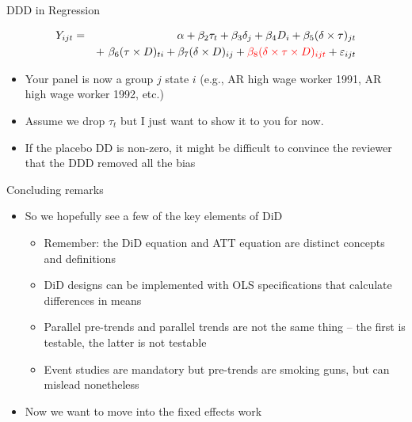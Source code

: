 \documentclass{beamer}
\begin{document}
\begin{frame}{DDD in Regression}
	
	\begin{eqnarray*}
	Y_{ijt} &=&\alpha +  \beta_2 \tau_t + \beta_3 \delta_j  + \beta_4 D_i + \beta_5(\delta \times \tau)_{jt} \\
	&& +\ \beta_6(\tau \times D)_{ti} +  \beta_7(\delta \times D)_{ij} +  \textcolor{red}{\beta_8(\delta \times \tau \times  D)_{ijt}}+  \varepsilon_{ijt}
	\end{eqnarray*}
	
	\begin{itemize}
	\item Your panel is now a group $j$ state $i$ (e.g., AR high wage worker 1991, AR high wage worker 1992, etc.)
	\item Assume we drop $\tau_t$ but I just want to show it to you for now.
	\item If the placebo DD is non-zero, it might be difficult to convince the reviewer that the DDD removed all the bias 
	\end{itemize}
	
\end{frame}




\begin{frame}{Concluding remarks}

\begin{itemize}
\item So we hopefully see a few of the key elements of DiD
	\begin{itemize}
	\item Remember: the DiD equation and ATT equation are distinct concepts and definitions
	\item DiD designs can be implemented with OLS specifications that calculate differences in means
	\item Parallel pre-trends and parallel trends are not the same thing -- the first is testable, the latter is not testable
	\item Event studies are mandatory but pre-trends are smoking guns, but can mislead nonetheless
	\end{itemize}
\item Now we want to move into the fixed effects work
\end{itemize}

\end{frame}
\end{document}
